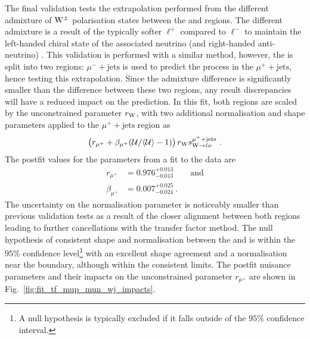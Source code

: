 The final validation tests the extrapolation performed from the different admixture of $\mathrm{W}^{\pm}$ polarisation states between the \ellplusjets and \metplusjets regions. The different admixture is a result of the typically softer $\ell^+$ \pt compared to $\ell^-$ \pt to maintain the left-handed chiral state of the associated neutrino (and right-handed anti-neutrino) \cite{Bern:2011ie}. This validation is performed with a similar method, however, the \muplusjets is split into two regions: $\mu^- +\mathrm{jets}$ is used to predict the \IWj process in the $\mu^+ + \mathrm{jets}$, hence testing this extrapolation. Since the admixture difference is significantly smaller than the difference between these two regions, any result discrepancies will have a reduced impact on the \IWj prediction. In this fit, both regions are scaled by the unconstrained parameter $r_\mathrm{W}$, with two additional normalisation and shape parameters applied to the $\mu^+ +\mathrm{jets}$ region as
%
\begin{equation}
    \left(r_{\mu^+} + \beta_{\mu^+}(\mathcal{U}/\langle\mathcal{U}\rangle-1)\right)r_\mathrm{W} s_{{\mathrm{W}\rightarrow \ell\nu}}^{\mu^++\mathrm{jets}}\ .
\end{equation}
%
The postfit values for the parameters from a fit to the data are
%
\begin{align}
    r_{\mu^+} & = 0.976^{+0.013}_{-0.013}\qquad\mathrm{and}\nonumber\\
    \beta_{\mu^+} & = 0.007^{+0.025}_{-0.024}\ .
\end{align}
%
The uncertainty on the normalisation parameter is noticeably smaller than previous validation tests as a result of the closer alignment between both regions leading to further cancellations with the transfer factor method. The null hypothesis of consistent shape and normalisation between the \mupplusjets and \munplusjets is within the $95\%$ confidence level\footnote{A null hypothesis is typically excluded if it falls outside of the $95\%$ confidence interval.} with an excellent shape agreement and a normalisation near the boundary, although within the consistent limits. The postfit nuisance parameters and their impacts on the unconstrained parameter $r_{\mu^+}$ are shown in Fig.~\ref{fig:fit_tf_mup_mun_wj_impacts}.
%
